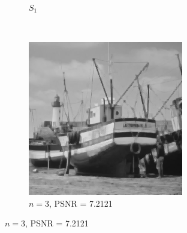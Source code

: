 \documentclass{article}
\begin{document}
\begin{enumerate}[label=(\alph*)]
\begin{figure}[!htb]
\begin{subfigure}[b]{0.3\textwidth}
            \caption{$S_1$}
        \end{subfigure}
        ~
        \begin{subfigure}[b]{0.3\textwidth}
            \includegraphics[width=\textwidth]{img/RSC3.png}
            \caption{$n = 3$, PSNR = 7.2121}
        \end{subfigure}
                
        

\end{figure}
\end{enumerate}
\end{document}
